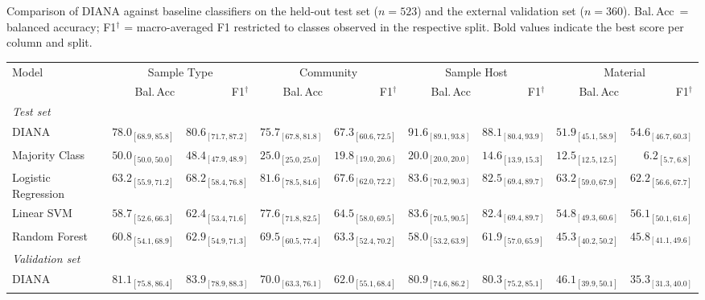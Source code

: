 \centering
\caption{Comparison of DIANA against baseline classifiers on the held-out test set ($n=523$) and the external validation set ($n=360$). Bal.\,Acc\ = balanced accuracy; F1$^\dagger$ = macro-averaged F1 restricted to classes observed in the respective split. Bold values indicate the best score per column and split.}
\label{tab:baseline_comparison}
\small
\begin{tabular}{lrrrrrrrr}
\toprule
Model & \multicolumn{2}{c}{Sample Type} & \multicolumn{2}{c}{Community} & \multicolumn{2}{c}{Sample Host} & \multicolumn{2}{c}{Material} \\
\cmidrule(lr){2-3} \cmidrule(lr){4-5} \cmidrule(lr){6-7} \cmidrule(lr){8-9}
& Bal.\,Acc & F1$^\dagger$ & Bal.\,Acc & F1$^\dagger$ & Bal.\,Acc & F1$^\dagger$ & Bal.\,Acc & F1$^\dagger$ \\
\midrule
\multicolumn{9}{l}{\textit{Test set}} \\
DIANA & $\mathbf{78.0}_{[68.9,85.8]}$ & $\mathbf{80.6}_{[71.7,87.2]}$ & $75.7_{[67.8,81.8]}$ & $67.3_{[60.6,72.5]}$ & $\mathbf{91.6}_{[89.1,93.8]}$ & $\mathbf{88.1}_{[80.4,93.9]}$ & $51.9_{[45.1,58.9]}$ & $54.6_{[46.7,60.3]}$ \\
Majority Class & $50.0_{[50.0,50.0]}$ & $48.4_{[47.9,48.9]}$ & $25.0_{[25.0,25.0]}$ & $19.8_{[19.0,20.6]}$ & $20.0_{[20.0,20.0]}$ & $14.6_{[13.9,15.3]}$ & $12.5_{[12.5,12.5]}$ & $6.2_{[5.7,6.8]}$ \\
Logistic Regression & $63.2_{[55.9,71.2]}$ & $68.2_{[58.4,76.8]}$ & $\mathbf{81.6}_{[78.5,84.6]}$ & $\mathbf{67.6}_{[62.0,72.2]}$ & $83.6_{[70.2,90.3]}$ & $82.5_{[69.4,89.7]}$ & $\mathbf{63.2}_{[59.0,67.9]}$ & $\mathbf{62.2}_{[56.6,67.7]}$ \\
Linear SVM & $58.7_{[52.6,66.3]}$ & $62.4_{[53.4,71.6]}$ & $77.6_{[71.8,82.5]}$ & $64.5_{[58.0,69.5]}$ & $83.6_{[70.5,90.5]}$ & $82.4_{[69.4,89.7]}$ & $54.8_{[49.3,60.6]}$ & $56.1_{[50.1,61.6]}$ \\
Random Forest & $60.8_{[54.1,68.9]}$ & $62.9_{[54.9,71.3]}$ & $69.5_{[60.5,77.4]}$ & $63.3_{[52.4,70.2]}$ & $58.0_{[53.2,63.9]}$ & $61.9_{[57.0,65.9]}$ & $45.3_{[40.2,50.2]}$ & $45.8_{[41.1,49.6]}$ \\
\midrule
\multicolumn{9}{l}{\textit{Validation set}} \\
DIANA & $\mathbf{81.1}_{[75.8,86.4]}$ & $\mathbf{83.9}_{[78.9,88.3]}$ & $\mathbf{70.0}_{[63.3,76.1]}$ & $\mathbf{62.0}_{[55.1,68.4]}$ & $80.9_{[74.6,86.2]}$ & $\mathbf{80.3}_{[75.2,85.1]}$ & $\mathbf{46.1}_{[39.9,50.1]}$ & $\mathbf{35.3}_{[31.3,40.0]}$ \\

\end{tabular}
